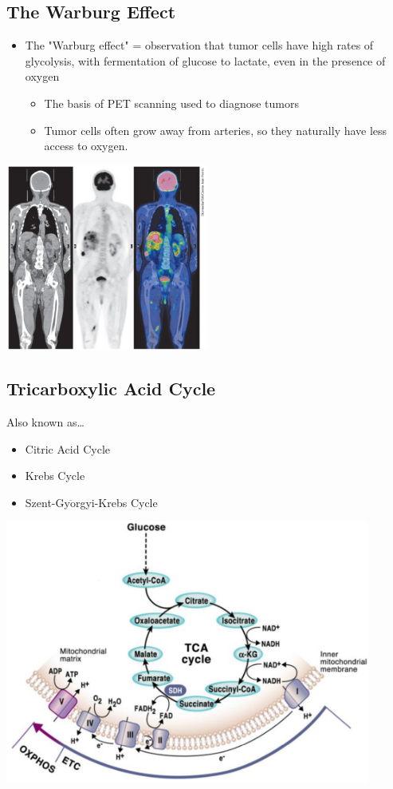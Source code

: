 \documentclass[10pt]{article}
\begin{document}
\subsection*{The Warburg Effect}
\begin{itemize}
	\item The "Warburg effect" = observation that tumor cells have high rates of glycolysis, with fermentation of glucose to lactate, even in the presence of oxygen
	\begin{itemize}
        \item The basis of PET scanning used to diagnose tumors
        \item Tumor cells often grow away from arteries, so they naturally have less access to oxygen.
    \end{itemize}
\end{itemize}
\begin{center} 
	\includegraphics*[width=0.5\textwidth]{L2_18.png}
\end{center}

\subsection*{Tricarboxylic Acid Cycle}
Also known as\dots
\begin{itemize}
	\item Citric Acid Cycle
	\item Krebs Cycle
	\item Szent-Gy$\ddot{\text{o}}$rgyi-Krebs Cycle
\end{itemize}
\begin{center} 
	\includegraphics*[width=0.9\textwidth]{L2_19.png}
\end{center}
\end{document}
